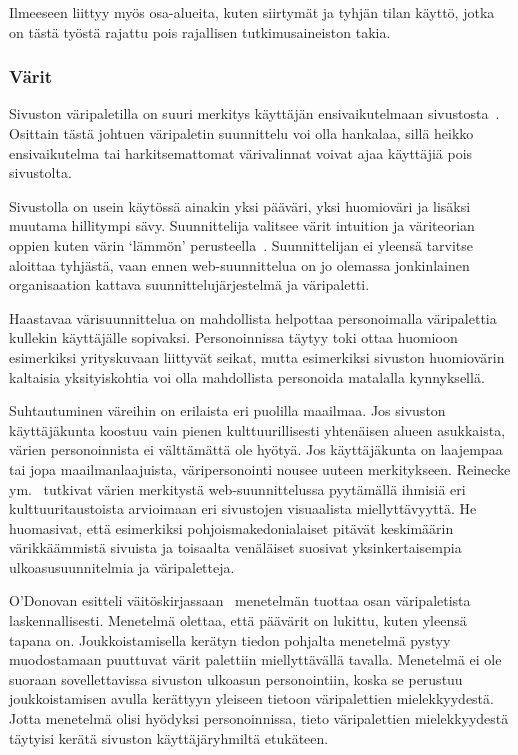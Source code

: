 \documentclass[finnish, 12pt, a4paper, elec, utf8, a-1b]{aaltothesis}
\begin{document}
Ilmeeseen liittyy myös osa-alueita, kuten siirtymät ja tyhjän tilan käyttö,
jotka on tästä työstä rajattu pois rajallisen tutkimusaineiston takia.

\subsubsection{Värit}\label{color-personalization}

Sivuston väripaletilla on suuri merkitys käyttäjän ensivaikutelmaan
sivustosta~\cite{10.1145/2470654.2481281}. Osittain tästä johtuen väripaletin
suunnittelu voi olla hankalaa, sillä heikko ensivaikutelma tai harkitsemattomat
värivalinnat voivat ajaa käyttäjiä pois sivustolta.

Sivustolla on usein käytössä ainakin yksi pääväri, yksi huomioväri ja
lisäksi muutama hillitympi sävy. Suunnittelija valitsee värit intuition ja
väriteorian oppien kuten värin `lämmön' perusteella~\cite{odonovan_2015}.
Suunnittelijan ei yleensä tarvitse aloittaa tyhjästä, vaan ennen
web-suunnittelua on jo olemassa jonkinlainen organisaation kattava
suunnittelujärjestelmä ja väripaletti.

Haastavaa värisuunnittelua on mahdollista helpottaa personoimalla väripalettia
kullekin käyttäjälle sopivaksi. Personoinnissa täytyy toki ottaa huomioon
esimerkiksi yrityskuvaan liittyvät seikat, mutta esimerkiksi sivuston
huomiovärin kaltaisia yksityiskohtia voi olla mahdollista personoida matalalla
kynnyksellä.

Suhtautuminen väreihin on erilaista eri puolilla maailmaa. Jos sivuston
käyttäjäkunta koostuu vain pienen kulttuurillisesti yhtenäisen alueen
asukkaista, värien personoinnista ei välttämättä ole hyötyä. Jos käyttäjäkunta
on laajempaa tai jopa maailmanlaajuista, väripersonointi nousee uuteen
merkitykseen. Reinecke ym.~\cite{10.1145/2556288.2557052} tutkivat värien
merkitystä web-suunnittelussa pyytämällä ihmisiä eri kulttuuritaustoista
arvioimaan eri sivustojen visuaalista miellyttävyyttä. He huomasivat, että
esimerkiksi pohjoismakedonialaiset pitävät keskimäärin värikkäämmistä sivuista
ja toisaalta venäläiset suosivat yksinkertaisempia ulkoasusuunnitelmia ja
väripaletteja.

O'Donovan esitteli väitöskirjassaan~\cite{odonovan_2015} menetelmän tuottaa
osan väripaletista laskennallisesti. Menetelmä olettaa, että päävärit on lukittu,
kuten yleensä tapana on. Joukkoistamisella kerätyn tiedon pohjalta menetelmä
pystyy muodostamaan puuttuvat värit palettiin miellyttävällä tavalla. Menetelmä
ei ole suoraan sovellettavissa sivuston ulkoasun personointiin, koska se
perustuu joukkoistamisen avulla kerättyyn yleiseen tietoon väripalettien
mielekkyydestä. Jotta menetelmä olisi hyödyksi personoinnissa, tieto
väripalettien mielekkyydestä täytyisi kerätä sivuston käyttäjäryhmiltä
etukäteen.
\end{document}
